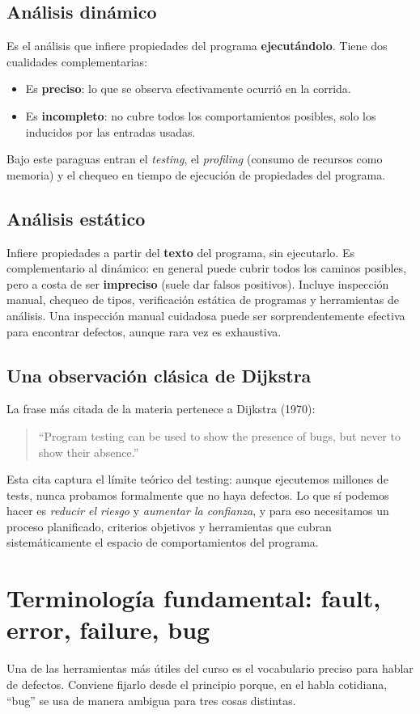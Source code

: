 \documentclass[12pt,a4paper]{article}
\begin{document}
\subsection{Análisis dinámico}
Es el análisis que infiere propiedades del programa \textbf{ejecutándolo}. Tiene dos cualidades complementarias:
\begin{itemize}
  \item Es \textbf{preciso}: lo que se observa efectivamente ocurrió en la corrida.
  \item Es \textbf{incompleto}: no cubre todos los comportamientos posibles, solo los inducidos por las entradas usadas.
\end{itemize}

Bajo este paraguas entran el \textit{testing}, el \textit{profiling} (consumo de recursos como memoria) y el chequeo en tiempo de ejecución de propiedades del programa.

\subsection{Análisis estático}
Infiere propiedades a partir del \textbf{texto} del programa, sin ejecutarlo. Es complementario al dinámico: en general puede cubrir todos los caminos posibles, pero a costa de ser \textbf{impreciso} (suele dar falsos positivos). Incluye inspección manual, chequeo de tipos, verificación estática de programas y herramientas de análisis. Una inspección manual cuidadosa puede ser sorprendentemente efectiva para encontrar defectos, aunque rara vez es exhaustiva.

\subsection{Una observación clásica de Dijkstra}
La frase más citada de la materia pertenece a Dijkstra (1970):
\begin{quote}
``Program testing can be used to show the presence of bugs, but never to show their absence.''
\end{quote}
Esta cita captura el límite teórico del testing: aunque ejecutemos millones de tests, nunca probamos formalmente que no haya defectos. Lo que sí podemos hacer es \textit{reducir el riesgo} y \textit{aumentar la confianza}, y para eso necesitamos un proceso planificado, criterios objetivos y herramientas que cubran sistemáticamente el espacio de comportamientos del programa.

\section{Terminología fundamental: fault, error, failure, bug}
Una de las herramientas más útiles del curso es el vocabulario preciso para hablar de defectos. Conviene fijarlo desde el principio porque, en el habla cotidiana, ``bug'' se usa de manera ambigua para tres cosas distintas.
\end{document}
